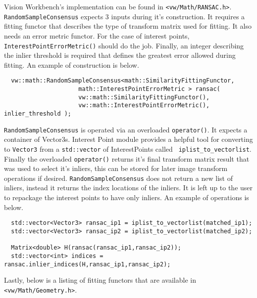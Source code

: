 Vision Workbench's implementation can be found in 
{\tt <vw/Math/RANSAC.h>}. {\tt RandomSampleConsensus} expects 3 inputs
during it's construction. It requires a fitting functor that describes
the type of transform matrix used for fitting. It also needs an error
metric functor. For the case of interest points, 
{\tt InterestPointErrorMetric()} should do the job. Finally, an integer
describing the inlier threshold is required that defines the greatest
error allowed during fitting. An example of construction is below.

\begin{verbatim}
  vw::math::RandomSampleConsensus<math::SimilarityFittingFunctor,
                     math::InterestPointErrorMetric > ransac(
                     vw::math::SimilarityFittingFunctor(),
                     vw::math::InterestPointErrorMetric(), inlier_threshold );
\end{verbatim}

{\tt RandomSampleConsensus} is operated via an overloaded {\tt operator()}. 
It expects a container of Vector3s. Interest Point
module provides a helpful tool for converting to {\tt Vector3} from a
{\tt std::vector} of InterestPoints called {\tt
  iplist\_to\_vectorlist}. Finally the overloaded {\tt operator()} returns
it's final transform matrix result that was used to select it's
inliers, this can be stored for later image transform operations if
desired. {\tt RandomSampleConsensus} does not return a new list of inliers,
instead it returns the index locations of the inliers. It is left up
to the user to repackage the interest points to have only inliers. An
example of operations is below.

\begin{verbatim}
  std::vector<Vector3> ransac_ip1 = iplist_to_vectorlist(matched_ip1);
  std::vector<Vector3> ransac_ip2 = iplist_to_vectorlist(matched_ip2);

  Matrix<double> H(ransac(ransac_ip1,ransac_ip2));
  std::vector<int> indices = ransac.inlier_indices(H,ransac_ip1,ransac_ip2);
\end{verbatim}

Lastly, below is a listing of fitting functors that are available in
{\tt <vw/Math/Geometry.h>}.

